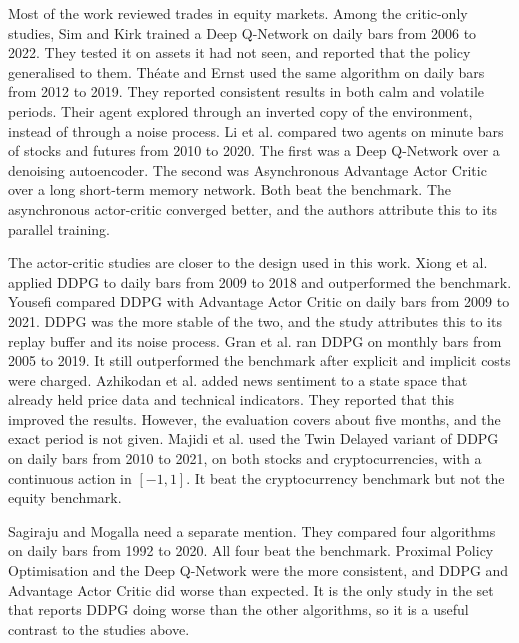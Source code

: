 Most of the work reviewed trades in equity markets. Among the critic-only studies, Sim and Kirk \cite{sim_generalized_2023} trained a Deep Q-Network on daily bars from 2006 to 2022. They tested it on assets it had not seen, and reported that the policy generalised to them. Théate and Ernst \cite{theate_application_2021} used the same algorithm on daily bars from 2012 to 2019. They reported consistent results in both calm and volatile periods. Their agent explored through an inverted copy of the environment, instead of through a noise process. Li et al. \cite{li_deep_2019} compared two agents on minute bars of stocks and futures from 2010 to 2020. The first was a Deep Q-Network over a denoising autoencoder. The second was Asynchronous Advantage Actor Critic over a long short-term memory network. Both beat the benchmark. The asynchronous actor-critic converged better, and the authors attribute this to its parallel training.

The actor-critic studies are closer to the design used in this work. Xiong et al. \cite{xiong_practical_2018} applied DDPG to daily bars from 2009 to 2018 and outperformed the benchmark. Yousefi \cite{yousefi_deep_2022} compared DDPG with Advantage Actor Critic on daily bars from 2009 to 2021. DDPG was the more stable of the two, and the study attributes this to its replay buffer and its noise process. Gran et al. \cite{gran_deep_2019} ran DDPG on monthly bars from 2005 to 2019. It still outperformed the benchmark after explicit and implicit costs were charged. Azhikodan et al. \cite{saini_stock_2019} added news sentiment to a state space that already held price data and technical indicators. They reported that this improved the results. However, the evaluation covers about five months, and the exact period is not given. Majidi et al. \cite{majidi_algorithmic_2022} used the Twin Delayed variant of DDPG on daily bars from 2010 to 2021, on both stocks and cryptocurrencies, with a continuous action in \([-1, 1]\). It beat the cryptocurrency benchmark but not the equity benchmark.

Sagiraju and Mogalla \cite{sagiraju_application_2021} need a separate mention. They compared four algorithms on daily bars from 1992 to 2020. All four beat the benchmark. Proximal Policy Optimisation and the Deep Q-Network were the more consistent, and DDPG and Advantage Actor Critic did worse than expected. It is the only study in the set that reports DDPG doing worse than the other algorithms, so it is a useful contrast to the studies above.

